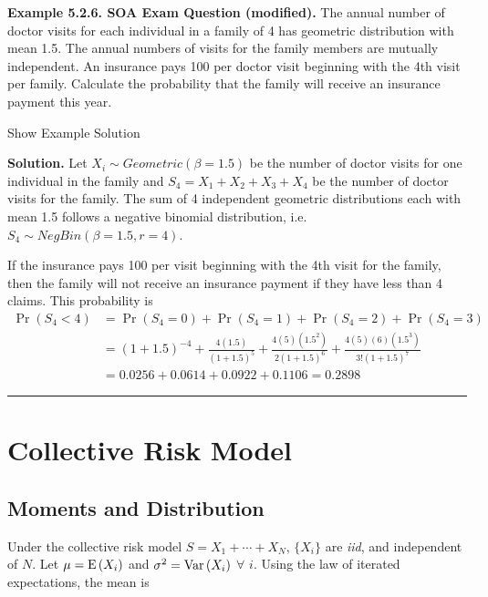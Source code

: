 \documentclass[]{book}
\theoremstyle{definition}
\theoremstyle{definition}
\theoremstyle{definition}
\theoremstyle{remark}
\begin{document}
\textbf{Example 5.2.6. SOA Exam Question (modified).} The annual number
of doctor visits for each individual in a family of 4 has geometric
distribution with mean 1.5. The annual numbers of visits for the family
members are mutually independent. An insurance pays 100 per doctor visit
beginning with the 4th visit per family. Calculate the probability that
the family will receive an insurance payment this year.

Show Example Solution

\hypertarget{toggleExampleAggLoss.2.6}{}
\textbf{Solution.} Let \(X_i \sim Geometric(\beta=1.5)\) be the number
of doctor visits for one individual in the family and
\(S_4 = X_1 + X_2 + X_3 + X_4\) be the number of doctor visits for the
family. The sum of 4 independent geometric distributions each with mean
1.5 follows a negative binomial distribution, i.e.
\(S_4 \sim NegBin(\beta=1.5, r=4)\).

If the insurance pays 100 per visit beginning with the 4th visit for the
family, then the family will not receive an insurance payment if they
have less than 4 claims. This probability is \[\begin{aligned}
    \Pr(S_4 < 4) &= \Pr(S_4 = 0) + \Pr(S_4 = 1) + \Pr(S_4 = 2) +\Pr(S_4 = 3) \\
    &= (1+1.5)^{-4} + \frac{4(1.5)}{(1+1.5)^5} + \frac{4(5)(1.5^2)}{2(1+1.5)^6} + \frac{4(5)(6)(1.5^3)}{3!(1+1.5)^7}\\
    &= 0.0256 + 0.0614 + 0.0922 + 0.1106 = 0.2898
\end{aligned}\]

\begin{center}\rule{0.5\linewidth}{\linethickness}\end{center}

\section{Collective Risk Model}\label{collective-risk-model}

\subsection{Moments and Distribution}\label{moments-and-distribution}

Under the collective risk model \(S=X_1+\cdots+X_N\), \(\{X_i\}\) are
\emph{iid}, and independent of \(N\). Let
\(\mu = {\rm E}\left( X_{i}\right)\) and
\(\sigma ^{2} = {\rm Var}\left(X_{i}\right)\) \(\forall\) \(i\). Using
the law of iterated expectations, the mean is
\end{document}
